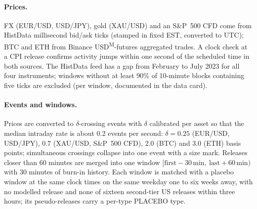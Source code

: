 \paragraph{Prices.}
FX (EUR/USD, USD/JPY), gold (XAU/USD) and an S\&P~500 CFD come from HistData
millisecond bid/ask ticks (stamped in fixed EST, converted to UTC); BTC and ETH from
Binance USD\textsuperscript{\tiny M}-futures aggregated trades. A clock check at a
CPI release confirms activity jumps within one second of the scheduled time in both
sources. The HistData feed has a gap from February to July 2023 for all four
instruments; windows without at least 90\% of 10-minute blocks containing five ticks
are excluded (per window, documented in the data card).

\paragraph{Events and windows.}
Prices are converted to $\delta$-crossing events with $\delta$ calibrated per asset so
that the median intraday rate is about 0.2 events per second:
$\delta=0.25$ (EUR/USD, USD/JPY), $0.7$ (XAU/USD, S\&P~500 CFD), $2.0$ (BTC) and $3.0$ (ETH)
basis points; simultaneous crossings collapse into one event with a size mark. Releases
closer than 60 minutes are merged into one window
$[\text{first}-30\,\text{min},\ \text{last}+60\,\text{min})$ with 30 minutes of burn-in
history. Each window is matched with a placebo window at the same clock times on the same
weekday one to six weeks away, with no modelled release and none of sixteen second-tier US
releases within three hours; its pseudo-releases carry a per-type PLACEBO type.
